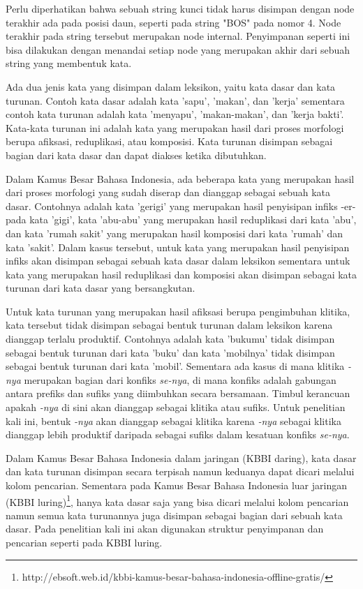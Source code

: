 Perlu diperhatikan bahwa sebuah string kunci tidak harus disimpan dengan node terakhir ada pada posisi daun, seperti pada string "BOS" pada nomor 4. Node terakhir pada string tersebut merupakan node internal. Penyimpanan seperti ini bisa dilakukan dengan menandai setiap node yang merupakan akhir dari sebuah string yang membentuk kata.

Ada dua jenis kata yang disimpan dalam leksikon, yaitu kata dasar dan kata turunan. Contoh kata dasar adalah kata 'sapu', 'makan', dan 'kerja' sementara contoh kata turunan adalah kata 'menyapu', 'makan-makan', dan 'kerja bakti'. Kata-kata turunan ini adalah kata yang merupakan hasil dari proses morfologi berupa afiksasi, reduplikasi, atau komposisi. Kata turunan disimpan sebagai bagian dari kata dasar dan dapat diakses ketika dibutuhkan. 

Dalam Kamus Besar Bahasa Indonesia, ada beberapa kata yang merupakan hasil dari proses morfologi yang sudah diserap dan dianggap sebagai sebuah kata dasar. Contohnya adalah kata 'gerigi' yang merupakan hasil penyisipan infiks -er- pada kata 'gigi', kata 'abu-abu' yang merupakan hasil reduplikasi dari kata 'abu', dan kata 'rumah sakit' yang merupakan hasil komposisi dari kata 'rumah' dan kata 'sakit'. Dalam kasus tersebut, untuk kata yang merupakan hasil penyisipan infiks akan disimpan sebagai sebuah kata dasar dalam leksikon sementara untuk kata yang merupakan hasil reduplikasi dan komposisi akan disimpan sebagai kata turunan dari kata dasar yang bersangkutan.

Untuk kata turunan yang merupakan hasil afiksasi berupa pengimbuhan klitika, kata tersebut tidak disimpan sebagai bentuk turunan dalam leksikon karena dianggap terlalu produktif. Contohnya adalah kata 'bukumu' tidak disimpan sebagai bentuk turunan dari kata 'buku' dan kata 'mobilnya' tidak disimpan sebagai bentuk turunan dari kata 'mobil'. Sementara ada kasus di mana klitika \textit{-nya} merupakan bagian dari konfiks \textit{se-nya}, di mana konfiks adalah gabungan antara prefiks dan sufiks yang diimbuhkan secara bersamaan. Timbul kerancuan apakah \textit{-nya} di sini akan dianggap sebagai klitika atau sufiks. Untuk penelitian kali ini, bentuk \textit{-nya} akan dianggap sebagai klitika karena \textit{-nya} sebagai klitika dianggap lebih produktif daripada sebagai sufiks dalam kesatuan konfiks \textit{se-nya}.

Dalam Kamus Besar Bahasa Indonesia dalam jaringan (KBBI daring), kata dasar dan kata turunan disimpan secara terpisah namun keduanya dapat dicari melalui kolom pencarian. Sementara pada Kamus Besar Bahasa Indonesia luar jaringan (KBBI luring)\footnote{http://ebsoft.web.id/kbbi-kamus-besar-bahasa-indonesia-offline-gratis/}, hanya kata dasar saja yang bisa dicari melalui kolom pencarian namun semua kata turunannya juga disimpan sebagai bagian dari sebuah kata dasar. Pada penelitian kali ini akan digunakan struktur penyimpanan dan pencarian seperti pada KBBI luring.

